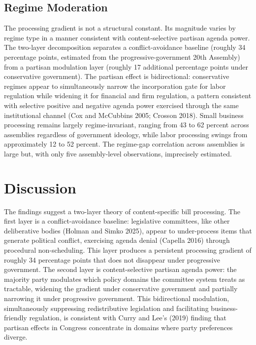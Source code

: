 \documentclass[11pt]{article}
\begin{document}
\subsection{Regime Moderation}

The processing gradient is not a structural constant. Its magnitude varies by regime type in a manner consistent with content-selective partisan agenda power. The two-layer decomposition separates a conflict-avoidance baseline (roughly 34 percentage points, estimated from the progressive-government 20th Assembly) from a partisan modulation layer (roughly 17 additional percentage points under conservative government). The partisan effect is bidirectional: conservative regimes appear to simultaneously narrow the incorporation gate for labor regulation while widening it for financial and firm regulation, a pattern consistent with selective positive and negative agenda power exercised through the same institutional channel (Cox and McCubbins 2005; Crosson 2018). Small business processing remains largely regime-invariant, ranging from 43 to 62 percent across assemblies regardless of government ideology, while labor processing swings from approximately 12 to 52 percent. The regime-gap correlation across assemblies is large but, with only five assembly-level observations, imprecisely estimated.


\section{Discussion}
\label{sec:discussion}

The findings suggest a two-layer theory of content-specific bill processing. The first layer is a conflict-avoidance baseline: legislative committees, like other deliberative bodies (Holman and Simko 2025), appear to under-process items that generate political conflict, exercising agenda denial (Capella 2016) through procedural non-scheduling. This layer produces a persistent processing gradient of roughly 34 percentage points that does not disappear under progressive government. The second layer is content-selective partisan agenda power: the majority party modulates which policy domains the committee system treats as tractable, widening the gradient under conservative government and partially narrowing it under progressive government. This bidirectional modulation, simultaneously suppressing redistributive legislation and facilitating business-friendly regulation, is consistent with Curry and Lee's (2019) finding that partisan effects in Congress concentrate in domains where party preferences diverge.
\end{document}
